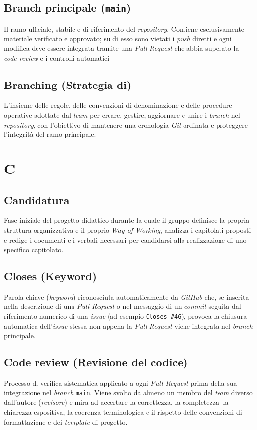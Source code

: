 \documentclass[11pt, a4paper]{article}
\begin{document}
\subsection*{Branch principale (\texttt{main})}
Il ramo ufficiale, stabile e di riferimento del \textit{repository}. Contiene esclusivamente materiale verificato e approvato; su di esso sono vietati i \textit{push} diretti e ogni modifica deve essere integrata tramite una \textit{Pull Request} che abbia superato la \textit{code review} e i controlli automatici.

\subsection*{Branching (Strategia di)}
L'insieme delle regole, delle convenzioni di denominazione e delle procedure operative adottate dal \textit{team} per creare, gestire, aggiornare e unire i \textit{branch} nel \textit{repository}, con l'obiettivo di mantenere una cronologia \textit{Git} ordinata e proteggere l'integrità del ramo principale.

\newpage

\section*{C}

\subsection*{Candidatura}
Fase iniziale del progetto didattico durante la quale il gruppo definisce la propria struttura organizzativa e il proprio \textit{Way of Working}, analizza i capitolati proposti e redige i documenti e i verbali necessari per candidarsi alla realizzazione di uno specifico capitolato.

\subsection*{Closes (Keyword)}
Parola chiave (\textit{keyword}) riconosciuta automaticamente da \textit{GitHub} che, se inserita nella descrizione di una \textit{Pull Request} o nel messaggio di un \textit{commit} seguita dal riferimento numerico di una \textit{issue} (ad esempio \texttt{Closes \#46}), provoca la chiusura automatica dell'\textit{issue} stessa non appena la \textit{Pull Request} viene integrata nel \textit{branch} principale.

\subsection*{Code review (Revisione del codice)}
Processo di verifica sistematica applicato a ogni \textit{Pull Request} prima della sua integrazione nel \textit{branch} \texttt{main}. Viene svolto da almeno un membro del \textit{team} diverso dall'autore (\textit{revisore}) e mira ad accertare la correttezza, la completezza, la chiarezza espositiva, la coerenza terminologica e il rispetto delle convenzioni di formattazione e dei \textit{template} di progetto.
\end{document}
